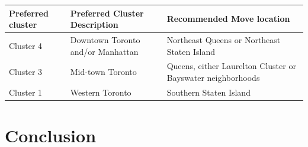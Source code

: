 \documentclass[11pt]{article}
\begin{document}
\begin{longtable}[]{@{}lll@{}}
\toprule
\begin{minipage}[b]{0.22\columnwidth}\raggedright\strut
Preferred cluster\strut
\end{minipage} & \begin{minipage}[b]{0.22\columnwidth}\raggedright\strut
Preferred Cluster Description\strut
\end{minipage} & \begin{minipage}[b]{0.22\columnwidth}\raggedright\strut
Recommended Move location\strut
\end{minipage}\tabularnewline
\midrule
\endhead
\begin{minipage}[t]{0.22\columnwidth}\raggedright\strut
Cluster 4\strut
\end{minipage} & \begin{minipage}[t]{0.22\columnwidth}\raggedright\strut
Downtown Toronto and/or Manhattan\strut
\end{minipage} & \begin{minipage}[t]{0.22\columnwidth}\raggedright\strut
Northeast Queens or Northeast Staten Island\strut
\end{minipage}\tabularnewline
\begin{minipage}[t]{0.22\columnwidth}\raggedright\strut
Cluster 3\strut
\end{minipage} & \begin{minipage}[t]{0.22\columnwidth}\raggedright\strut
Mid-town Toronto\strut
\end{minipage} & \begin{minipage}[t]{0.22\columnwidth}\raggedright\strut
Queens, either Laurelton Cluster or Bayswater neighborhoods\strut
\end{minipage}\tabularnewline
\begin{minipage}[t]{0.22\columnwidth}\raggedright\strut
Cluster 1\strut
\end{minipage} & \begin{minipage}[t]{0.22\columnwidth}\raggedright\strut
Western Toronto\strut
\end{minipage} & \begin{minipage}[t]{0.22\columnwidth}\raggedright\strut
Southern Staten Island\strut
\end{minipage}\tabularnewline
\bottomrule
\end{longtable}

    

    \section{Conclusion}\label{conclusion}
\end{document}

